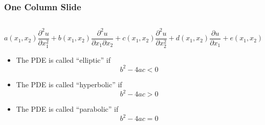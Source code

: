 \documentclass[18pt,xcolor=table]{beamer}
\begin{document}
\begin{frame}
    \frametitle{One Column Slide}
    \begin{columns}
    \begin{column}[t]{\linewidth}
        {\footnotesize
        $$
            a(x_1,x_2) \frac{\partial^2 u}{\partial x_1^2} + b(x_1,x_2) \frac{\partial^2 u}{\partial x_1\partial x_2} +
            c(x_1,x_2) \frac{\partial^2 u}{\partial x_2^2} + d(x_1,x_2) \frac{\partial u}{\partial x_1} +
            e(x_1,x_2) \frac{\partial u}{\partial x_2} + f(x_1,x_2) u = g(x_1,x_2)
        $$
        }
        \begin{itemize}
            \item {The PDE is called ``elliptic'' if
                $$
                     {
                     b^2 - 4ac < 0
                     }
                $$}
            \item {The PDE is called ``hyperbolic'' if
                $$
                     {
                     b^2 - 4ac > 0
                     }
                $$}
            \item {The PDE is called ``parabolic'' if
                $$
                     {
                     b^2 - 4ac = 0
                     }
                $$}
        \end{itemize}
    \end{column}
    \end{columns}
\end{frame}

\end{document}
